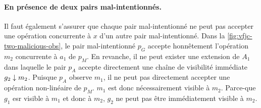 \paragraph{En présence de deux pairs mal-intentionnés.}
Il faut également s'assurer que chaque pair mal-intentionné ne peut pas accepter une opération concurrente à $x$ d'un autre pair mal-intentionné.
Dans la \autoref{fig:vfjc-two-malicious-obs}, le pair mal-intentionné $p_G$ accepte honnêtement l'opération $m_2$ concurrente à $a_1$ de $p_M$.
En revanche, il ne peut exister une extension de $A_1$ dans laquelle le pair $p_A$ accepte directement une chaîne de visibilité immédiate $g_2 \downarrow m_2$.
Puisque $p_A$ observe $m_1$, il ne peut pas directement accepter une opération non-linéaire de $p_M$.
$m_1$ est donc nécessairement visible à $m_2$.
Parce-que $g_1$ esr visible à $m_1$ et donc à $m_2$, $g_2$ ne peut pas être immédiatement visible à $m_2$.


